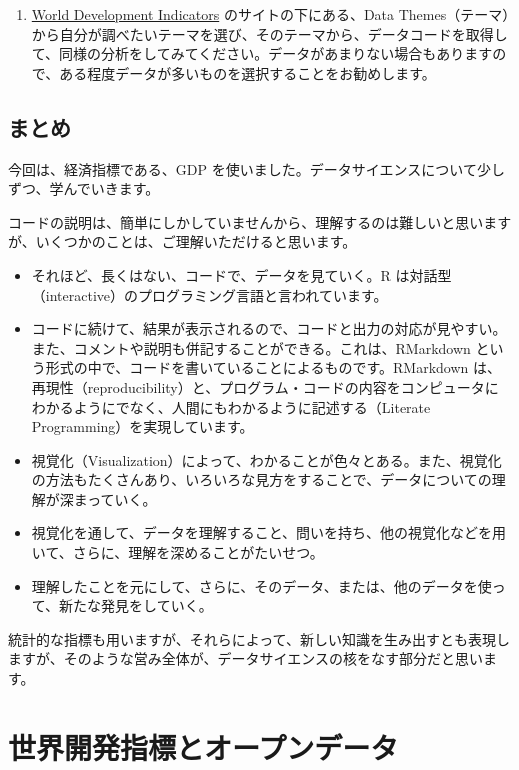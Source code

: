 \documentclass[
  xelatex, ja=standard]{bxjsbook}
\providecommand{\tightlist}{%
  \setlength{\itemsep}{0pt}\setlength{\parskip}{0pt}}
\theoremstyle{definition}
\theoremstyle{definition}
\theoremstyle{definition}
\theoremstyle{definition}
\theoremstyle{remark}
\begin{document}
\begin{enumerate}
\def\labelenumi{\arabic{enumi}.}
\setcounter{enumi}{1}
\tightlist
\item
  \href{https://datatopics.worldbank.org/world-development-indicators/}{World Development Indicators} のサイトの下にある、Data Themes（テーマ）から自分が調べたいテーマを選び、そのテーマから、データコードを取得して、同様の分析をしてみてください。データがあまりない場合もありますので、ある程度データが多いものを選択することをお勧めします。
\end{enumerate}

\hypertarget{ux307eux3068ux3081}{%
\section{まとめ}\label{ux307eux3068ux3081}}

今回は、経済指標である、GDP を使いました。データサイエンスについて少しずつ、学んでいきます。

コードの説明は、簡単にしかしていませんから、理解するのは難しいと思いますが、いくつかのことは、ご理解いただけると思います。

\begin{itemize}
\item
  それほど、長くはない、コードで、データを見ていく。R は対話型（interactive）のプログラミング言語と言われています。
\item
  コードに続けて、結果が表示されるので、コードと出力の対応が見やすい。また、コメントや説明も併記することができる。これは、RMarkdown という形式の中で、コードを書いていることによるものです。RMarkdown は、再現性（reproducibility）と、プログラム・コードの内容をコンピュータにわかるようにでなく、人間にもわかるように記述する（Literate Programming）を実現しています。
\item
  視覚化（Visualization）によって、わかることが色々とある。また、視覚化の方法もたくさんあり、いろいろな見方をすることで、データについての理解が深まっていく。
\item
  視覚化を通して、データを理解すること、問いを持ち、他の視覚化などを用いて、さらに、理解を深めることがたいせつ。
\item
  理解したことを元にして、さらに、そのデータ、または、他のデータを使って、新たな発見をしていく。
\end{itemize}

統計的な指標も用いますが、それらによって、新しい知識を生み出すとも表現しますが、そのような営み全体が、データサイエンスの核をなす部分だと思います。

\hypertarget{wdi-site}{%
\chapter{世界開発指標とオープンデータ}\label{wdi-site}}
\end{document}
